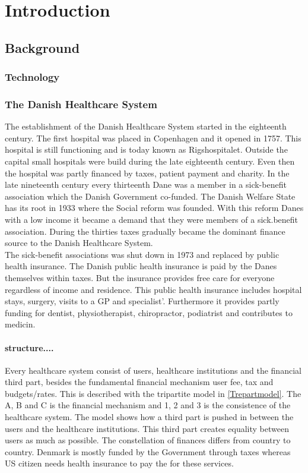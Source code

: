 \chapter{Introduction}

\section{Background}
\subsection{Technology}
\subsection{The Danish Healthcare System}



The establishment of the Danish Healthcare System started in the eighteenth century. The first hospital was placed in Copenhagen and it opened in 1757. This hospital is still functioning and is today known as Rigshospitalet. Outside the capital small hospitals were build during the late eighteenth century. Even then the hospital was partly financed by taxes, patient payment and charity. In the late nineteenth century every thirteenth Dane was a member in a sick-benefit association which the Danish Government co-funded. The Danish Welfare State has its root in 1933 where the Social reform was founded. With this reform Danes with a low income it became a demand that they were members of a sick.benefit association. During the thirties taxes gradually became the dominant finance source to the Danish Healthcare System.\\ 
The sick-benefit associations was shut down in 1973 and replaced by public health insurance. The Danish public health insurance is paid by the Danes themselves within taxes. But the insurance provides free care for everyone regardless of  income and residence. This public health insurance includes hospital stays, surgery, visits to a GP and specialist'. Furthermore it provides partly funding for dentist, physiotherapist, chiropractor, podiatrist and contributes to medicin.   \\
\subsubsection{structure....}
Every healthcare system consist of users, healthcare institutions and the financial third part, besides the fundamental financial mechanism user fee, tax and budgets/rates. This is described with the tripartite model in \cref{Trepartmodel}. The A, B and C is the financial mechanism and 1, 2 and 3 is the consistence of the healthcare system. The model shows how a third part is pushed in between the users and the healthcare institutions. This third part creates equality between users as much as possible. The constellation of finances differs from country to country. Denmark is mostly funded by the Government through taxes whereas US citizen needs health insurance to pay the for these services. \\
 

